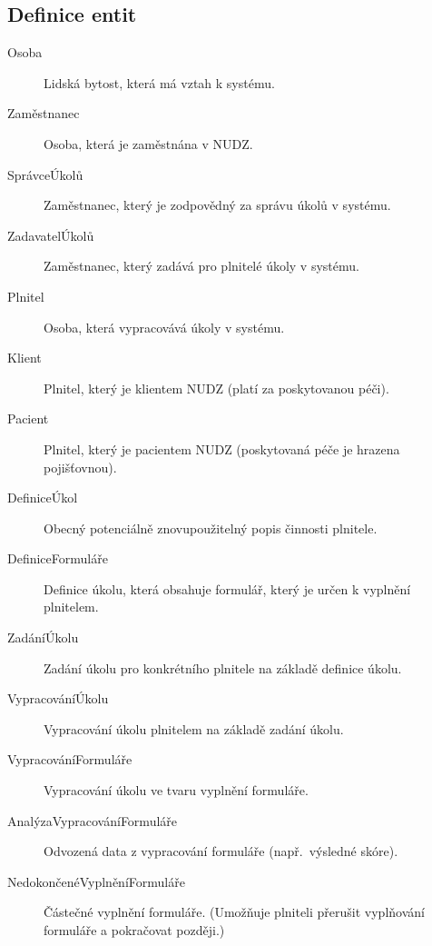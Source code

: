 \subsection{Definice entit}\label{subsec:definiceentit}

\begin{description}
\item[Osoba]
  Lidská bytost, která má vztah k systému.

\item[Zaměstnanec]
  Osoba, která je zaměstnána v NUDZ\@.

\item[SprávceÚkolů]
  Zaměstnanec, který je zodpovědný za správu úkolů v systému.

\item[ZadavatelÚkolů]
  Zaměstnanec, který zadává pro plnitelé úkoly v systému.

\item[Plnitel]
  Osoba, která vypracovává úkoly v systému.

\item[Klient]
  Plnitel, který je klientem NUDZ (platí za poskytovanou péči).

\item[Pacient]
  Plnitel, který je pacientem NUDZ (poskytovaná péče je hrazena pojišťovnou).

\item[DefiniceÚkol]
  Obecný potenciálně znovupoužitelný popis činnosti plnitele.

\item[DefiniceFormuláře]
  Definice úkolu, která obsahuje formulář, který je určen k vyplnění plnitelem.

\item[ZadáníÚkolu]
  Zadání úkolu pro konkrétního plnitele na základě definice úkolu.

\item[VypracováníÚkolu]
  Vypracování úkolu plnitelem na základě zadání úkolu.

\item[VypracováníFormuláře]
  Vypracování úkolu ve tvaru vyplnění formuláře.

\item[AnalýzaVypracováníFormuláře]
Odvozená data z vypracování formuláře (např.\ výsledné skóre).

\item[NedokončenéVyplněníFormuláře]
Částečné vyplnění formuláře.
(Umožňuje plniteli přerušit vyplňování formuláře a pokračovat později.)

\end{description}

